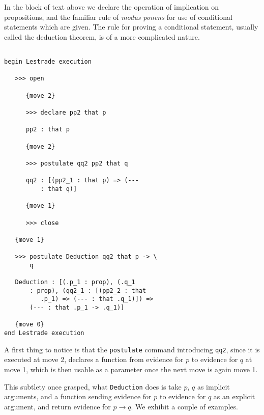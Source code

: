 \documentclass[12pt]{article}
\begin{document}
In the block of text above we declare the operation of implication on propositions, and the familiar rule of {\em modus ponens\/} for use of conditional statements which are given.  The rule for proving a conditional statement, usually called the deduction theorem, is of a more complicated nature.

\begin{verbatim}

begin Lestrade execution

   >>> open

      {move 2}

      >>> declare pp2 that p

      pp2 : that p

      {move 2}

      >>> postulate qq2 pp2 that q

      qq2 : [(pp2_1 : that p) => (--- 
          : that q)]

      {move 1}

      >>> close

   {move 1}

   >>> postulate Deduction qq2 that p -> \
       q

   Deduction : [(.p_1 : prop), (.q_1 
       : prop), (qq2_1 : [(pp2_2 : that 
          .p_1) => (--- : that .q_1)]) => 
       (--- : that .p_1 -> .q_1)]

   {move 0}
end Lestrade execution

\end{verbatim}

A first thing to notice is that the {\tt postulate} command introducing {\tt qq2}, since it is executed at move 2, declares a function from evidence for $p$ to evidence for $q$ at move 1, which is then usable as a parameter once the next move is again move 1.

This subtlety once grasped, what {\tt Deduction\/} does is take $p$, $q$ as implicit arguments, and a function sending
evidence for $p$ to evidence for $q$ as an explicit argument, and return evidence for $p \rightarrow q$.
\newpage
We exhibit a couple of examples.
\end{document}

